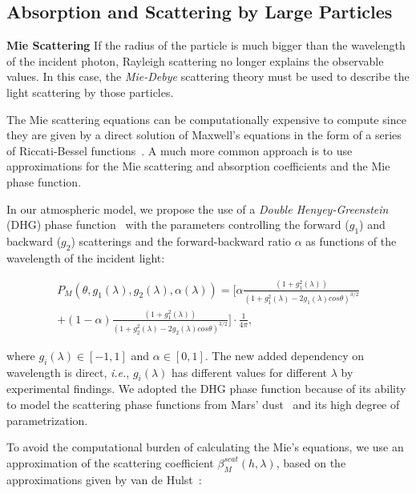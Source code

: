 \documentclass[journal]{vgtc}                %
\newcommand{\review}[1]{{\color{blue}#1}}
\begin{document}
\subsection{Absorption and Scattering by Large Particles}

\noindent \textbf{Mie Scattering} \quad If the radius of the particle is much bigger than the wavelength of the incident photon, Rayleigh scattering no longer explains the observable values. In this case, the \textit{Mie-Debye} scattering theory must be used to describe the light scattering by those particles. 

The Mie scattering equations can be computationally expensive to compute since they are given by a direct solution of Maxwell's equations in the form of a series of Riccati-Bessel functions~\cite{Hulst:1981, Mishchenko:2006}. A much more common approach is to use approximations for the Mie scattering and \review{absorption} coefficients and the Mie phase function.

In our atmospheric model, we propose the use of a \textit{Double Henyey-Greenstein} (DHG) phase function~\cite{Kattawar:1975} with the parameters controlling the forward ($g_1$) and backward ($g_2$) scatterings and the forward-backward ratio $\alpha$ as functions of the wavelength of the incident light:

\vspace*{-4.5mm}
{
  \small
\begin{multline}
P_M(\theta, g_1(\lambda), g_2(\lambda), \alpha(\lambda)) = \bigg[ \alpha\frac{(1+g_1^2(\lambda))}{(1+g_1^2(\lambda)-2g_1(\lambda)cos\theta)^{3/2}}\\
    + (1 - \alpha)\frac{(1+g_1^2(\lambda))}{(1+g_2^2(\lambda)-2g_2(\lambda)cos\theta)^{3/2}} \bigg] \cdot\frac{1}{4\pi},
\label{eq:phase-mie}    
\end{multline}
}
\vspace*{-3.5mm}

\noindent where $g_i(\lambda) \in [-1, 1]$ and $\alpha \in [0, 1]$. The new added dependency \review{on wavelength} is direct, \textit{i.e.}, $g_i(\lambda)$ has different values for different $\lambda$ by experimental findings.
%
We adopted the DHG phase function because of its ability \review{to model} the scattering phase functions from Mars' dust~\cite{Chen:2019} and \review{its} high degree of parametrization.

To avoid the computational burden of calculating the Mie's equations, we use an approximation of the scattering coefficient $\beta_M^{scat}(h, \lambda)$, based on the approximations given by van de Hulst~\cite{Hulst:1981}:
\end{document}
